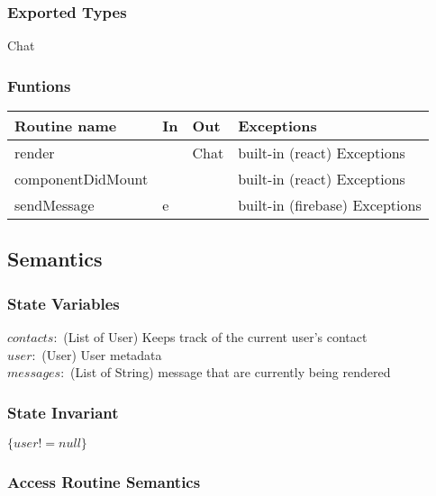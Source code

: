\documentclass[12pt, titlepage]{article}
\begin{document}
\subsubsection* {Exported Types} Chat
\subsubsection* {Funtions}
\begin{tabular}{| l | l | l | l |}
\hline
\textbf{Routine name} & \textbf{In} & \textbf{Out} & \textbf{Exceptions}\\
\hline
render & ~ & Chat & built-in (react) Exceptions \\
\hline
componentDidMount & ~ & ~ & built-in (react) Exceptions\\
\hline
sendMessage & e & ~ & built-in (firebase) Exceptions\\
\hline
\end{tabular}
\subsection* {Semantics}

\subsubsection* {State Variables}
$contacts: $ (List of User) Keeps track of the current user's contact\\
$user:$ (User) User metadata\\
$messages:$ (List of String) message that are currently being rendered\\
\subsubsection* {State Invariant}

$\{user != null\}$
\subsubsection* {Access Routine Semantics}
\end{document}
